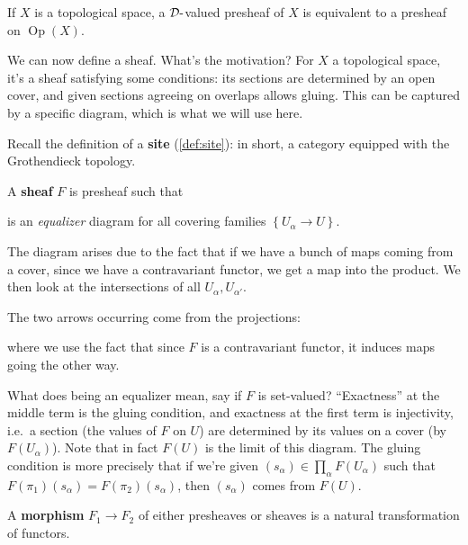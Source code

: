 \begin{example}[?]

If \(X\) is a topological space, a \(\mathcal{D}{\hbox{-}}\)valued
presheaf of \(X\) is equivalent to a presheaf on
\({\operatorname{Op}}(X)\).

\end{example}

We can now define a sheaf. What's the motivation? For \(X\) a
topological space, it's a sheaf satisfying some conditions: its sections
are determined by an open cover, and given sections agreeing on overlaps
allows gluing. This can be captured by a specific diagram, which is what
we will use here.

Recall the definition of a \textbf{site} (\cref{def:site}): in short, a
category equipped with the Grothendieck topology.

\begin{definition}[Sheaf]

A \textbf{sheaf} \(F\) is presheaf such that

is an \emph{equalizer} diagram for all covering families
\(\left\{{U_\alpha \to U}\right\}\).

\end{definition}

\begin{remark}

The diagram arises due to the fact that if we have a bunch of maps
coming from a cover, since we have a contravariant functor, we get a map
into the product. We then look at the intersections of all
\(U_{\alpha}, U_{\alpha'}\).

The two arrows occurring come from the projections:

where we use the fact that since \(F\) is a contravariant functor, it
induces maps going the other way.

What does being an equalizer mean, say if \(F\) is set-valued?
``Exactness'' at the middle term is the gluing condition, and exactness
at the first term is injectivity, i.e.~a section (the values of \(F\) on
\(U\)) are determined by its values on a cover (by \(F(U_\alpha)\)).
Note that in fact \(F(U)\) is the limit of this diagram. The gluing
condition is more precisely that if we're given
\((s_\alpha) \in \prod_\alpha F(U_\alpha)\) such that
\(F(\pi_1)(s_\alpha) = F(\pi_2)(s_\alpha)\), then \((s_\alpha)\) comes
from \(F(U)\).

\end{remark}

\begin{definition}

A \textbf{morphism} \(F_1\to F_2\) of either presheaves or sheaves is a
natural transformation of functors.

\end{definition}

